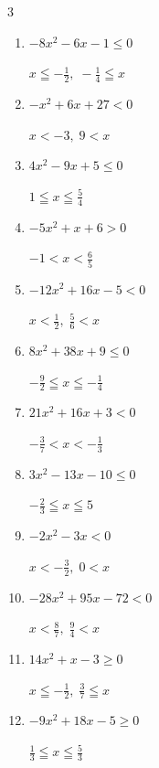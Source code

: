 \begin{multicols}{3}
\begin{enumerate}
\columnbreak %

  \item $-8x^{2}-6x-1\leq 0$

        $\displaystyle x \leqq -\frac{1}{2} , \; -\frac{1}{4} \leqq x$

  \item $-x^{2}+6x+27<0$

        $\displaystyle x < -3 , \; 9 < x$

  \item $4x^{2}-9x+5\leq 0$

        $\displaystyle 1 \leqq x \leqq \frac{5}{4}$

  \item $-5x^{2}+x+6>0$

        $\displaystyle -1 < x < \frac{6}{5}$

  \item $-12x^{2}+16x-5<0$

        $\displaystyle x < \frac{1}{2} , \; \frac{5}{6} < x$

  \item $8x^{2}+38x+9\leq 0$

        $\displaystyle -\frac{9}{2} \leqq x \leqq -\frac{1}{4}$

  \item $21x^{2}+16x+3<0$

        $\displaystyle -\frac{3}{7} < x < -\frac{1}{3}$

  \item $3x^{2}-13x-10\leq 0$

        $\displaystyle -\frac{2}{3} \leqq x \leqq 5$

  \item $-2x^{2}-3x<0$

        $\displaystyle x < -\frac{3}{2} , \; 0 < x$

  \item $-28x^{2}+95x-72<0$

        $\displaystyle x < \frac{8}{7} , \; \frac{9}{4} < x$

\columnbreak %

  \item $14x^{2}+x-3\geq 0$

        $\displaystyle x \leqq -\frac{1}{2} , \; \frac{3}{7} \leqq x$

  \item $-9x^{2}+18x-5\geq 0$

        $\displaystyle \frac{1}{3} \leqq x \leqq \frac{5}{3}$


\end{enumerate}
\end{multicols}
